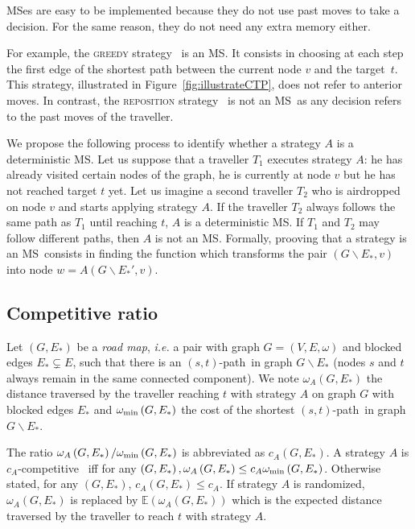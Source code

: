 \documentclass[11pt,letterpaper]{article}
\newcommand{\stpath}{$(s,t)$-path}
\newcommand{\omegamin}{\omega_{\mbox{\scriptsize{min}}}}
\newcommand{\mts}{MS}
\begin{document}
\mts es are easy to be implemented because they do not use past moves to take a decision.  For the same reason, they do not need any extra memory either.

For example, the \textsc{greedy} strategy~\cite{XuHuSuZh09} is an \mts . It consists in choosing at each step the first edge of the shortest path between the current node $v$ and the target~$t$. This strategy, illustrated in Figure~\ref{fig:illustrateCTP}, does not refer to anterior moves. In contrast, the \textsc{reposition} strategy~\cite{We08} is not an \mts ~as any decision refers to the past moves of the traveller. 

We propose the following process to identify whether a strategy $A$ is a deterministic \mts . Let us suppose that a traveller $T_1$ executes strategy $A$: he has already visited certain nodes of the graph, he is currently at node $v$ but he has not reached target $t$ yet. Let us imagine a second traveller $T_2$ who is airdropped on node $v$ and starts applying strategy $A$. If the traveller $T_2$ always follows the same path as $T_1$ until reaching $t$, $A$ is a deterministic \mts . If $T_1$ and $T_2$ may follow different paths, then $A$ is not an \mts . Formally, prooving that a strategy is an \mts ~consists in finding the function which transforms the pair $\left(G\backslash E_*,v\right)$ into node $w = A\left(G\backslash E_*',v\right)$.

\subsection{Competitive ratio} \label{subsec:compratio}

Let $\left(G,E_*\right)$ be a \textit{road map}, {\em i.e.} a pair with graph $G=\left(V,E,\omega\right)$ and blocked edges $E_* \subsetneq E$, such that there is an \stpath ~in graph $G\backslash E_*$ (nodes $s$ and $t$ always remain in the same connected component). We note $\omega_A\left(G,E_*\right)$ the distance traversed by the traveller reaching $t$ with strategy $A$ on graph $G$ with blocked edges $E_*$ and $\omegamin\left(G,E_*\right)$ the cost of the shortest \stpath ~in graph $G\backslash E_*$.

The ratio $\omega_A\left(G,E_*\right)/\omegamin\left(G,E_*\right)$ is abbreviated as $c_A\left(G,E_*\right)$. A strategy $A$ is $c_A$-competitive~\cite{BoEl98,XuHuSuZh09} iff for any $\left(G,E_*\right), \omega_A\left(G,E_*\right) \leq c_A \omegamin\left(G,E_*\right)$. Otherwise stated, for any $\left(G,E_*\right)$, $c_A\left(G,E_*\right) \leq c_A$. If strategy $A$ is randomized, $\omega_A\left(G,E_*\right)$ is replaced by $\mathbb{E}\left(\omega_A\left(G,E_*\right)\right)$ which is the expected distance traversed by the traveller to reach $t$ with strategy $A$.
\end{document}
